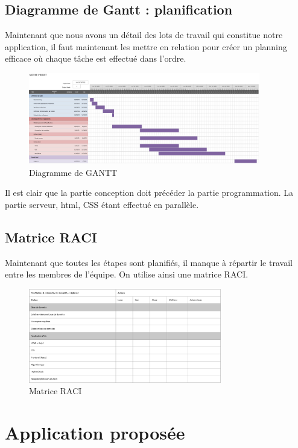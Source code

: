 \documentclass[french,a4paper]{article}
\begin{document}
\subsection{Diagramme de Gantt : planification}
Maintenant que nous avons un détail des lots de travail qui constitue notre application, il faut maintenant les mettre en relation pour créer un planning efficace où chaque tâche est effectué dans l’ordre. 
\begin{figure}[H]
    \centering
    \includegraphics[width=0.9\textwidth]{img/gantt.jpeg}
    \caption{Diagramme de GANTT}
\end{figure} 
Il est clair que la partie conception doit précéder la partie programmation. La partie serveur, html, CSS étant effectué en parallèle.

\subsection{Matrice RACI}
Maintenant que toutes les étapes sont planifiés, il manque à répartir le travail entre les membres de l’équipe. On utilise ainsi une matrice RACI. 
\begin{figure}[H]
    \centering
    \includegraphics[width=0.75\textwidth]{img/RACI.png}
    \caption{Matrice RACI}
\end{figure} 

\newpage
\section{Application proposée}
\end{document}
